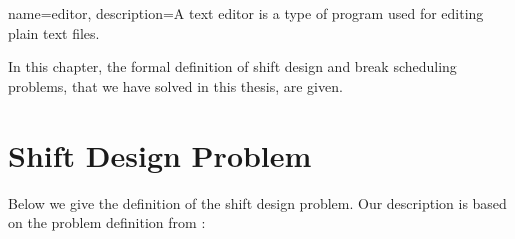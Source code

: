 %
%
%
%



{
  name={editor},
  description={A text editor is a type of program used for editing plain text files.}
}

In this chapter, the formal definition of shift design and break scheduling problems, that we have solved in this thesis, are given. 


\section{Shift Design Problem}
Below we give the definition of the shift design problem. Our description is based on the problem definition from \cite{li:2001:gärtner} \cite{li:2004:musliu}:

